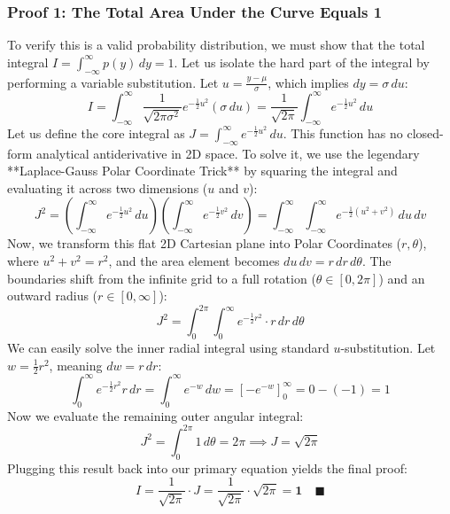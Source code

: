 \documentclass{article}
\begin{document}
\subsubsection*{Proof 1: The Total Area Under the Curve Equals 1}
To verify this is a valid probability distribution, we must show that the total integral $I = \int_{-\infty}^{\infty} p(y) \, dy = 1$. Let us isolate the hard part of the integral by performing a variable substitution. Let $u = \frac{y - \mu}{\sigma}$, which implies $dy = \sigma \, du$:
\begin{equation}
    I = \int_{-\infty}^{\infty} \frac{1}{\sqrt{2\pi\sigma^2}} e^{-\frac{1}{2}u^2} (\sigma \, du) = \frac{1}{\sqrt{2\pi}} \int_{-\infty}^{\infty} e^{-\frac{1}{2}u^2} \, du
\end{equation}
Let us define the core integral as $J = \int_{-\infty}^{\infty} e^{-\frac{1}{2}u^2} \, du$. This function has no closed-form analytical antiderivative in 2D space. To solve it, we use the legendary **Laplace-Gauss Polar Coordinate Trick** by squaring the integral and evaluating it across two dimensions ($u$ and $v$):
\begin{equation}
    J^2 = \left( \int_{-\infty}^{\infty} e^{-\frac{1}{2}u^2} \, du \right) \left( \int_{-\infty}^{\infty} e^{-\frac{1}{2}v^2} \, dv \right) = \int_{-\infty}^{\infty} \int_{-\infty}^{\infty} e^{-\frac{1}{2}(u^2 + v^2)} \, du \, dv
\end{equation}
Now, we transform this flat 2D Cartesian plane into Polar Coordinates ($r, \theta$), where $u^2 + v^2 = r^2$, and the area element becomes $du \, dv = r \, dr \, d\theta$. The boundaries shift from the infinite grid to a full rotation ($\theta \in [0, 2\pi]$) and an outward radius ($r \in [0, \infty]$):
\begin{equation}
    J^2 = \int_{0}^{2\pi} \int_{0}^{\infty} e^{-\frac{1}{2}r^2} \cdot r \, dr \, d\theta
\end{equation}
We can easily solve the inner radial integral using standard $u$-substitution. Let $w = \frac{1}{2}r^2$, meaning $dw = r \, dr$:
\begin{equation}
    \int_{0}^{\infty} e^{-\frac{1}{2}r^2} r \, dr = \int_{0}^{\infty} e^{-w} \, dw = \left[ -e^{-w} \right]_{0}^{\infty} = 0 - (-1) = 1
\end{equation}
Now we evaluate the remaining outer angular integral:
\begin{equation}
    J^2 = \int_{0}^{2\pi} 1 \, d\theta = 2\pi \implies J = \sqrt{2\pi}
\end{equation}
Plugging this result back into our primary equation yields the final proof:
\begin{equation}
    I = \frac{1}{\sqrt{2\pi}} \cdot J = \frac{1}{\sqrt{2\pi}} \cdot \sqrt{2\pi} = \mathbf{1} \quad \blacksquare
\end{equation}
\end{document}
